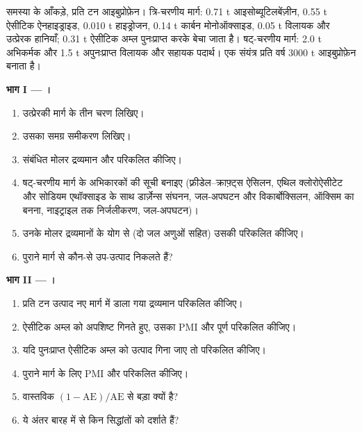 \begin{problem}
\label{pb:b3:green-industrial:1}
समस्या के आँकड़े, प्रति टन आइबुप्रोफ़ेन। त्रि-चरणीय मार्ग: 0.71 t
आइसोब्यूटिलबेंज़ीन, 0.55 t ऐसीटिक ऐनहाइड्राइड, 0.010 t हाइड्रोजन, 0.14 t कार्बन
मोनोऑक्साइड, 0.05 t विलायक और उत्प्रेरक हानियाँ; 0.31 t ऐसीटिक अम्ल पुनःप्राप्त
करके बेचा जाता है। षट्-चरणीय मार्ग: 2.0 t अभिकर्मक और 1.5 t अपुनःप्राप्त विलायक
और सहायक पदार्थ। एक संयंत्र प्रति वर्ष 3000 t आइबुप्रोफ़ेन बनाता है।

\medskip\noindent\textbf{भाग I --- ।}
\begin{enumerate}
  \item उत्प्रेरकी मार्ग के तीन चरण लिखिए।
  \item उसका समग्र समीकरण लिखिए।
  \item संबंधित मोलर द्रव्यमान और  परिकलित कीजिए।
  \item षट्-चरणीय मार्ग के अभिकारकों की सूची बनाइए (फ़्रीडेल--क्राफ़्ट्स ऐसिलन, एथिल
        क्लोरोऐसीटेट और सोडियम एथॉक्साइड के साथ डार्ज़ेन्स संघनन, जल-अपघटन और
        विकार्बोक्सिलन, ऑक्सिम का बनना, नाइट्राइल तक निर्जलीकरण, जल-अपघटन)।
  \item उनके मोलर द्रव्यमानों के योग से (दो जल अणुओं सहित) उसकी 
        परिकलित कीजिए।
  \item पुराने मार्ग से कौन-से उप-उत्पाद निकलते हैं?
\end{enumerate}

\medskip\noindent\textbf{भाग II --- ।}
\begin{enumerate}[resume]
  \item प्रति टन उत्पाद नए मार्ग में डाला गया द्रव्यमान परिकलित कीजिए।
  \item ऐसीटिक अम्ल को अपशिष्ट गिनते हुए, उसका PMI और पूर्ण  परिकलित कीजिए।
  \item यदि पुनःप्राप्त ऐसीटिक अम्ल को उत्पाद गिना जाए तो  परिकलित कीजिए।
  \item पुराने मार्ग के लिए PMI और  परिकलित कीजिए।
  \item वास्तविक  $(1 - \mathrm{AE})/\mathrm{AE}$ से बड़ा क्यों है?
  \item ये अंतर बारह में से किन सिद्धांतों को दर्शाते हैं?
\end{enumerate}


\end{problem}
